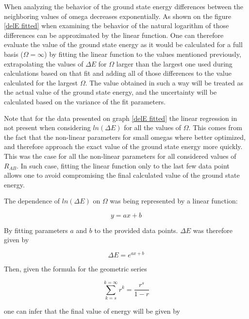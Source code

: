 \documentclass{pracalicmgr}
\begin{document}
When analyzing the behavior of the ground state energy differences between the neighboring values of omega decreases exponentially. As shown on the figure \ref{delE fitted} when examining the behavior of the natural logarithm of those differences can be approximated by the linear function. One can therefore evaluate the value of the ground state energy as it would be calculated for a full basis ($\Omega = \infty$) by fitting the linear function to the values mentioned previously, extrapolating the values of $\Delta E$ for $\Omega$ larger than the largest one used during calculations based on that fit and adding all of those differences to the value calculated for the largest $\Omega$. The value obtained in such a way will be treated as the actual value of the ground state energy, and the uncertainty will be calculated based on the variance of the fit parameters.

Note that for the data presented on graph \ref{delE fitted} the linear regression in not present when considering  $ln\left(\Delta E\right)$ for all the values of $\Omega$. This comes from the fact that the non-linear parameters for small omegas where better optimized, and therefore approach the exact value of the ground state energy more quickly. This was the case for all the non-linear parameters for all considered values of $R_{AB}$. In such case, fitting the linear function only to the last few data point allows one to avoid compromising the final calculated value of the ground state energy.

The dependence of $ln\left(\Delta E\right)$ on $\Omega$ was being represented by a linear function:

\begin{equation}
    y = ax+b
    \label{linear function}
\end{equation}

By fitting parameters $a$ and $b$ to the provided data points. $\Delta E$ was therefore given by

\begin{equation}
    \Delta E = e^{ax+b}
    \label{delEExp}
\end{equation}

Then, given the formula for the geometric series

\begin{equation}
    \sum_{k=s}^{k=\infty} r^k = \frac{r^s}{1-r}
\end{equation}

one can infer that the final value of energy will be given by 
\end{document}
